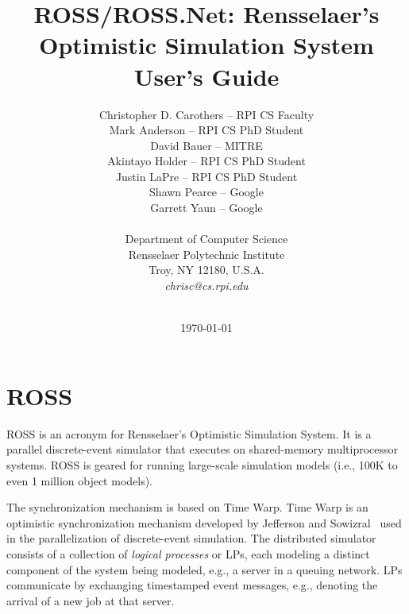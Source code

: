 \documentclass[12pt]{article}
\begin{document}

\title{ROSS/ROSS.Net: Rensselaer's Optimistic Simulation System\\ User's Guide}

\author{
 Christopher D. Carothers -- RPI CS Faculty  \\[12pt]
 Mark Anderson -- RPI CS PhD Student       \\
 David Bauer -- MITRE                      \\	
 Akintayo Holder -- RPI CS PhD Student     \\
 Justin LaPre -- RPI CS PhD Student        \\
 Shawn Pearce -- Google                    \\
 Garrett Yaun -- Google                    \\[12pt]
                                           \\
 Department of Computer Science \\
 Rensselaer Polytechnic Institute \\
 Troy, NY 12180, U.S.A.\\
 {\em chrisc@cs.rpi.edu}\\ \\
}

\date{\today}
\maketitle

\pagebreak

\tableofcontents

\pagebreak

\section{ROSS}
ROSS is an acronym for Rensselaer's Optimistic Simulation System.  It is a
parallel discrete-event simulator that executes on shared-memory
multiprocessor systems. ROSS is geared for running large-scale simulation
models (i.e., 100K to even 1 million object models).

The synchronization mechanism is based on Time Warp. Time Warp is an
optimistic synchronization mechanism developed by Jefferson and
Sowizral~\cite{jefferson-tr-82,jefferson-toplas-85} used in the
parallelization of discrete-event simulation. The distributed simulator
consists of a collection of {\em logical processes} or LPs, each modeling a
distinct component of the system being modeled, e.g., a server in a queuing
network.  LPs communicate by exchanging timestamped event messages, e.g.,
denoting the arrival of a new job at that server.
\end{document}
